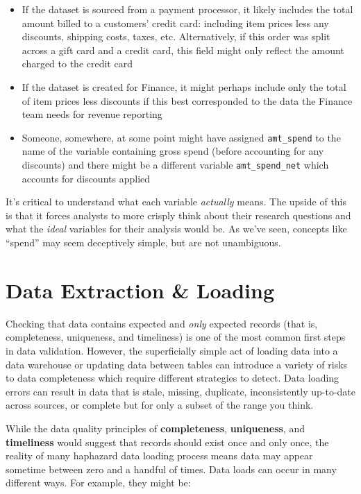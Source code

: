 \documentclass[
]{krantz}
\providecommand{\tightlist}{%
  \setlength{\itemsep}{0pt}\setlength{\parskip}{0pt}}
\begin{document}
\begin{itemize}
\tightlist
\item
  If the dataset is sourced from a payment processor, it likely includes the total amount billed to a customers' credit card: including item prices less any discounts, shipping costs, taxes, etc. Alternatively, if this order was split across a gift card and a credit card, this field might only reflect the amount charged to the credit card
\item
  If the dataset is created for Finance, it might perhaps include only the total of item prices less discounts if this best corresponded to the data the Finance team needs for revenue reporting
\item
  Someone, somewhere, at some point might have assigned \texttt{amt\_spend} to the name of the variable containing gross spend (before accounting for any discounts) and there might be a different variable \texttt{amt\_spend\_net} which accounts for discounts applied
\end{itemize}

It's critical to understand what each variable \emph{actually} means.
The upside of this is that it forces analysts to more crisply think about their research questions and what the \emph{ideal} variables for their analysis would be.
As we've seen, concepts like ``spend'' may seem deceptively simple, but are not unambiguous.

\hypertarget{data-extraction-loading}{%
\section{Data Extraction \& Loading}\label{data-extraction-loading}}

Checking that data contains expected and \emph{only} expected records (that is, completeness, uniqueness, and timeliness) is one of the most common first steps in data validation.
However, the superficially simple act of loading data into a data warehouse or updating data between tables can introduce a variety of risks to data completeness which require different strategies to detect.
Data loading errors can result in data that is stale, missing, duplicate, inconsistently up-to-date across sources, or complete but for only a subset of the range you think.

While the data quality principles of \textbf{completeness}, \textbf{uniqueness}, and \textbf{timeliness} would suggest that records should exist once and only once, the reality of many haphazard data loading process means data may appear sometime between zero and a handful of times. Data loads can occur in many different ways.
For example, they might be:
\end{document}
